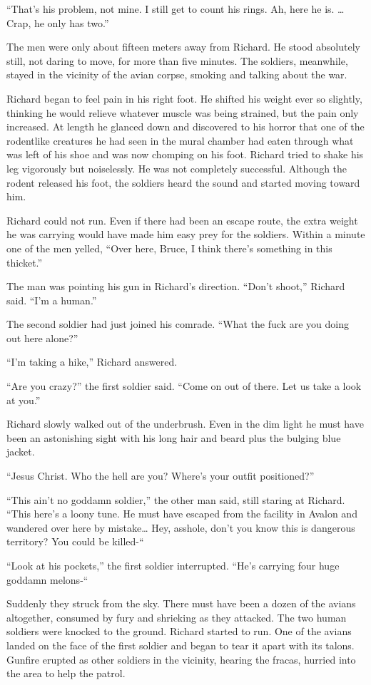\documentclass[]{article}
\begin{document}
{{“That’s his problem, not mine.  I still get to count his rings.  Ah, here he is.  … Crap, he only has two.”

The men were only about fifteen meters away from Richard.  He stood absolutely still, not daring to move, for more than five minutes.  The soldiers, meanwhile, stayed in the vicinity of the avian corpse, smoking and talking about the war.

Richard began to feel pain in his right foot.  He shifted his weight ever so slightly, thinking he would relieve whatever muscle was being strained, but the pain only increased.  At length he glanced down and discovered to his horror that one of the rodentlike creatures he had seen in the mural chamber had eaten through what was left of his shoe and was now chomping on his foot.  Richard tried to shake his leg vigorously but noiselessly.  He was not completely successful.  Although the rodent released his foot, the soldiers heard the sound and started moving toward him.

Richard could not run.  Even if there had been an escape route, the extra weight he was carrying would have made him easy prey for the soldiers.  Within a minute one of the men yelled, “Over here, Bruce, I think there’s something in this thicket.”

The man was pointing his gun in Richard’s direction.  “Don’t shoot,” Richard said.  “I’m a human.”

The second soldier had just joined his comrade.  “What the fuck are you doing out here alone?”

“I’m taking a hike,” Richard answered.

“Are you crazy?” the first soldier said.  “Come on out of there.  Let us take a look at you.”

Richard slowly walked out of the underbrush.  Even in the dim light he must have been an astonishing sight with his long hair and beard plus the bulging blue jacket.

“Jesus Christ.  Who the hell are you? Where’s your outfit positioned?”

“This ain’t no goddamn soldier,” the other man said, still staring at Richard.  “This here’s a loony tune.  He must have escaped from the facility in Avalon and wandered over here by mistake…  Hey, asshole, don’t you know this is dangerous territory? You could be killed-“

“Look at his pockets,” the first soldier interrupted.  “He’s carrying four huge goddamn melons-“

Suddenly they struck from the sky.  There must have been a dozen of the avians altogether, consumed by fury and shrieking as they attacked.  The two human soldiers were knocked to the ground.  Richard started to run.  One of the avians landed on the face of the first soldier and began to tear it apart with its talons.  Gunfire erupted as other soldiers in the vicinity, hearing the fracas, hurried into the area to help the patrol.

}}
\end{document}

